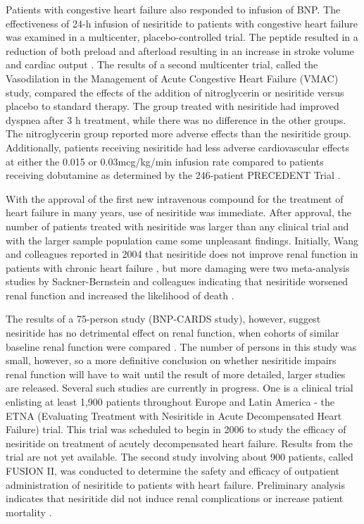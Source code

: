 \documentclass[14pt,a4paper,onecolumn]{extarticle}
\begin{document}
Patients with congestive heart failure also responded to infusion of BNP.  The effectiveness of 24-h infusion of nesiritide to patients with congestive heart failure was examined in a multicenter, placebo-controlled trial. The peptide resulted in a reduction of both preload and afterload resulting in an increase in stroke volume and cardiac output \citep{Mills1999}.
The results of a second multicenter trial, called the Vasodilation in the Management of Acute Congestive Heart Failure (VMAC) study, compared the effects of the addition of nitroglycerin or nesiritide versus placebo to standard therapy. The group treated with nesiritide had improved dyspnea after 3 h treatment, while there was no difference in the other groups. The nitroglycerin group reported more adverse effects than the nesiritide group. Additionally, patients receiving nesiritide had less adverse cardiovascular effects at either the 0.015 or 0.03mcg/kg/min infusion rate compared to patients receiving dobutamine as determined by the 246-patient PRECEDENT Trial \citep{deLissovoy2003}.  %

With the approval of the first new intravenous compound for the treatment of heart failure in many years, use of nesiritide was immediate. After approval, the number of patients treated with nesiritide was larger than any clinical trial and with the larger sample population came some unpleasant findings. Initially, Wang and colleagues reported in 2004 that nesiritide does not improve renal function in patients with chronic heart failure \citep{Wang2004a}, but more damaging were two meta-analysis studies by Sackner-Bernstein and colleagues indicating that nesiritide worsened renal function and increased the likelihood of death \citep{Sackner-Bernstein2005a} \citep{Sackner-Bernstein2005b}. %

The results of a 75-person study (BNP-CARDS study), however, suggest nesiritide has no detrimental effect on renal function, when cohorts of similar baseline renal function were compared \citep{Witteles2007}. The number of persons in this study was small, however, so a more definitive conclusion on whether nesiritide impairs renal function will have to wait until the result of more detailed, larger studies are released. Several such studies are currently in progress. One is a clinical trial enlisting at least 1,900 patients throughout Europe and Latin America - the ETNA (Evaluating Treatment with Nesiritide in Acute Decompensated Heart Failure) trial.
This trial was scheduled to begin in 2006 to study the efficacy of nesiritide on treatment of acutely decompensated heart failure. Results from the trial are not yet available. The second study involving about 900 patients, called FUSION II, was conducted to determine the safety and efficacy of outpatient administration of nesiritide to patients with heart failure. Preliminary analysis indicates that nesiritide did not induce renal complications or increase patient mortality \citep{Cleland2007}. %
\end{document}
